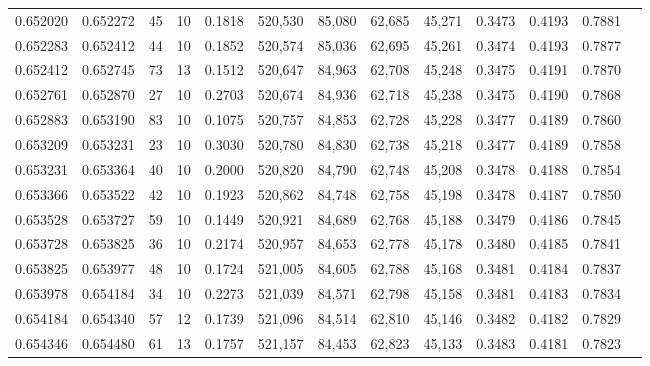 \begin{tabular}{rrrrrrrrrrrrr}
0.652020 & 0.652272 &    45 &  10 &                                     0.1818 & 520,530 &  85,080 &  62,685 &  45,271 & 0.3473 & 0.4193 & 0.7881 \\
0.652283 & 0.652412 &    44 &  10 &                                     0.1852 & 520,574 &  85,036 &  62,695 &  45,261 & 0.3474 & 0.4193 & 0.7877 \\
0.652412 & 0.652745 &    73 &  13 &                                     0.1512 & 520,647 &  84,963 &  62,708 &  45,248 & 0.3475 & 0.4191 & 0.7870 \\
0.652761 & 0.652870 &    27 &  10 &                                     0.2703 & 520,674 &  84,936 &  62,718 &  45,238 & 0.3475 & 0.4190 & 0.7868 \\
0.652883 & 0.653190 &    83 &  10 &                                     0.1075 & 520,757 &  84,853 &  62,728 &  45,228 & 0.3477 & 0.4189 & 0.7860 \\
0.653209 & 0.653231 &    23 &  10 &                                     0.3030 & 520,780 &  84,830 &  62,738 &  45,218 & 0.3477 & 0.4189 & 0.7858 \\
0.653231 & 0.653364 &    40 &  10 &                                     0.2000 & 520,820 &  84,790 &  62,748 &  45,208 & 0.3478 & 0.4188 & 0.7854 \\
0.653366 & 0.653522 &    42 &  10 &                                     0.1923 & 520,862 &  84,748 &  62,758 &  45,198 & 0.3478 & 0.4187 & 0.7850 \\
0.653528 & 0.653727 &    59 &  10 &                                     0.1449 & 520,921 &  84,689 &  62,768 &  45,188 & 0.3479 & 0.4186 & 0.7845 \\
0.653728 & 0.653825 &    36 &  10 &                                     0.2174 & 520,957 &  84,653 &  62,778 &  45,178 & 0.3480 & 0.4185 & 0.7841 \\
0.653825 & 0.653977 &    48 &  10 &                                     0.1724 & 521,005 &  84,605 &  62,788 &  45,168 & 0.3481 & 0.4184 & 0.7837 \\
0.653978 & 0.654184 &    34 &  10 &                                     0.2273 & 521,039 &  84,571 &  62,798 &  45,158 & 0.3481 & 0.4183 & 0.7834 \\
0.654184 & 0.654340 &    57 &  12 &                                     0.1739 & 521,096 &  84,514 &  62,810 &  45,146 & 0.3482 & 0.4182 & 0.7829 \\
0.654346 & 0.654480 &    61 &  13 &                                     0.1757 & 521,157 &  84,453 &  62,823 &  45,133 & 0.3483 & 0.4181 & 0.7823 \\

\end{tabular}
